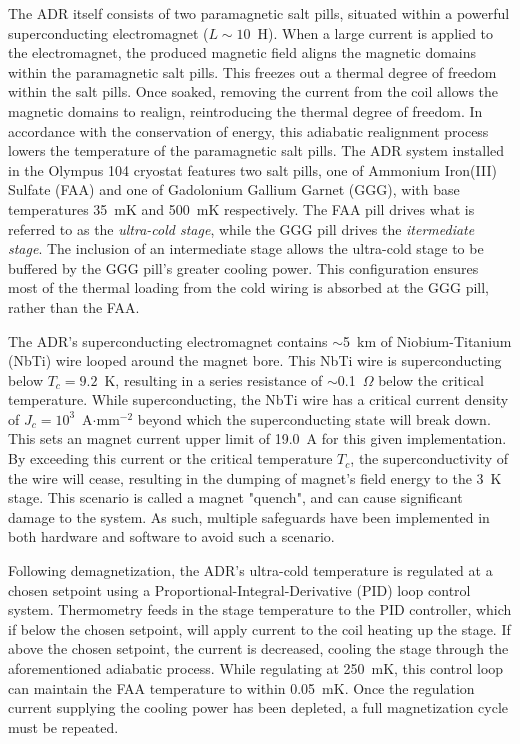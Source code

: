 \documentclass[iop]{emulateapj}
\begin{document}
The ADR itself consists of two paramagnetic salt pills, situated within a powerful superconducting electromagnet ($L\sim10$~H).  When a large current is applied to the electromagnet, the produced magnetic field aligns the magnetic domains within the paramagnetic salt pills.  This freezes out a thermal degree of freedom within the salt pills.  Once soaked, removing the current from the coil allows the magnetic domains to realign, reintroducing the thermal degree of freedom.  In accordance with the conservation of energy, this adiabatic realignment process lowers the temperature of the paramagnetic salt pills.  The ADR system installed in the Olympus 104 cryostat features two salt pills, one of Ammonium Iron(III) Sulfate (FAA) and one of Gadolonium Gallium Garnet (GGG), with base temperatures 35~mK and 500~mK respectively.  The FAA pill drives what is referred to as the \textit{ultra-cold stage}, while the GGG pill drives the \textit{itermediate stage}.  The inclusion of an intermediate stage allows the ultra-cold stage to be buffered by the GGG pill's greater cooling power.  This configuration ensures most of the thermal loading from the cold wiring is absorbed at the GGG pill, rather than the FAA.  

The ADR's superconducting electromagnet contains $\sim$5~km of Niobium-Titanium (NbTi) wire looped around the magnet bore.  This NbTi wire is superconducting below $T_c=9.2$~K, resulting in a series resistance of $\sim$0.1~$\Omega$ below the critical temperature.  While superconducting, the NbTi wire has a critical current density of $J_c=10^3$~A$\cdot$mm$^{-2}$ beyond which the superconducting state will break down.  This sets an magnet current upper limit of 19.0~A for this given implementation.  By exceeding this current or the critical temperature $T_c$, the superconductivity of the wire will cease, resulting in the dumping of magnet's field energy to the 3~K stage.  This scenario is called a magnet "quench", and can cause significant damage to the system.  As such, multiple safeguards have been implemented in both hardware and software to avoid such a scenario.

Following demagnetization, the ADR's ultra-cold temperature is regulated at a chosen setpoint using a Proportional-Integral-Derivative (PID) loop control system.  Thermometry feeds in the stage temperature to the PID controller, which if below the chosen setpoint, will apply current to the coil heating up the stage.  If above the chosen setpoint, the current is decreased, cooling the stage through the aforementioned adiabatic process.  While regulating at 250~mK, this control loop can maintain the FAA temperature to within 0.05~mK.  Once the regulation current supplying the cooling power has been depleted, a full magnetization cycle must be repeated.
\end{document}
